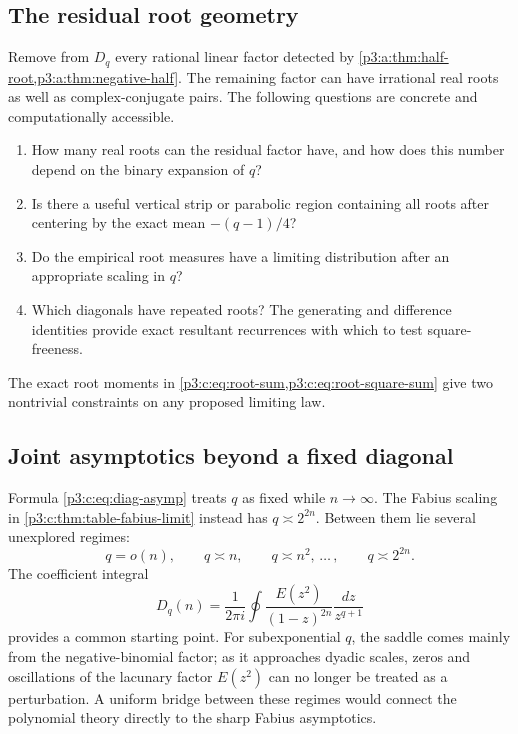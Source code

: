 \documentclass[11pt,oneside]{article}
\numberwithin{equation}{section}
\theoremstyle{definition}
\theoremstyle{remark}
\begin{document}
\subsection{The residual root geometry}

Remove from \(D_q\) every rational linear factor detected by
\cref{p3:a:thm:half-root,p3:a:thm:negative-half}.  The remaining factor can
have irrational real roots as well as complex-conjugate pairs.  The
following questions are concrete and computationally accessible.

\begin{enumerate}[leftmargin=2.2em]
\item How many real roots can the residual factor have, and how does this
number depend on the binary expansion of \(q\)?
\item Is there a useful vertical strip or parabolic region containing all
roots after centering by the exact mean \(-(q-1)/4\)?
\item Do the empirical root measures have a limiting distribution after an
appropriate scaling in \(q\)?
\item Which diagonals have repeated roots?  The generating and difference
identities provide exact resultant recurrences with which to test
square-freeness.
\end{enumerate}

The exact root moments in \cref{p3:c:eq:root-sum,p3:c:eq:root-square-sum} give two
nontrivial constraints on any proposed limiting law.

\subsection{Joint asymptotics beyond a fixed diagonal}

Formula \cref{p3:c:eq:diag-asymp} treats \(q\) as fixed while \(n\to\infty\).
The Fabius scaling in \cref{p3:c:thm:table-fabius-limit} instead has
\(q\asymp2^{2n}\).  Between them lie several unexplored regimes:
\begin{equation}
 q=o(n),\qquad q\asymp n,\qquad q\asymp n^2,
 \,\ldots\,,\qquad q\asymp2^{2n}.                         \label{p3:c:eq:scaling-regimes}
\end{equation}
The coefficient integral
\begin{equation}
 D_q(n)=\frac{1}{2\pi i}\oint
  \frac{E(z^2)}{(1-z)^{2n}}\frac{dz}{z^{q+1}}           \label{p3:c:eq:diag-Cauchy}
\end{equation}
provides a common starting point.  For subexponential \(q\), the saddle
comes mainly from the negative-binomial factor; as it approaches dyadic
scales, zeros and oscillations of the lacunary factor \(E(z^2)\) can no
longer be treated as a perturbation.  A uniform bridge between these
regimes would connect the polynomial theory directly to the sharp Fabius
asymptotics.
\end{document}

